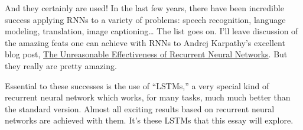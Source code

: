 And they certainly are used! In the last few years, there have been incredible success applying RNNs to a variety of problems: speech recognition, language modeling, translation, image captioning… The list goes on. I’ll leave discussion of the amazing feats one can achieve with RNNs to Andrej Karpathy’s excellent blog post, \href{http://karpathy.github.io/2015/05/21/rnn-effectiveness/}{The Unreasonable Effectiveness of Recurrent Neural Networks}. But they really are pretty amazing.

Essential to these successes is the use of “LSTMs,” a very special kind of recurrent neural network which works, for many tasks, much much better than the standard version. Almost all exciting results based on recurrent neural networks are achieved with them. It’s these LSTMs that this essay will explore.